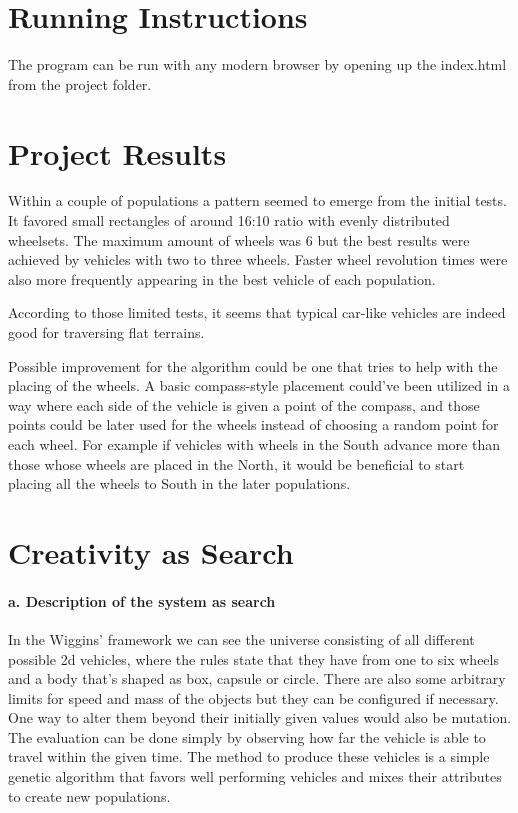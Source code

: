 \documentclass[english]{tktltiki}
\begin{document}
\section{Running Instructions}
The program can be run with any modern browser by opening up the index.html from the project folder.


\pagebreak
\section{Project Results}
Within a couple of populations a pattern seemed to emerge from the initial tests. It favored small rectangles of around 16:10 ratio with evenly distributed wheelsets. The maximum amount of wheels was 6 but
the best results were achieved by vehicles with two to three wheels. Faster wheel revolution times were also more frequently appearing in the best vehicle of each population.

According to those limited tests, it seems that typical car-like vehicles are indeed good for traversing flat terrains.

Possible improvement for the algorithm could be one that tries to help with the placing of the wheels. A basic compass-style placement could've been utilized in a way where each side of the vehicle
is given a point of the compass, and those points could be later used for the wheels instead of choosing a random point for each wheel. For example if vehicles with wheels in the South advance more than
those whose wheels are placed in the North, it would be beneficial to start placing all the wheels to South in the later populations.

\pagebreak

\section{Creativity as Search}

\paragraph{a. Description of the system as search}
In the Wiggins' framework we can see the universe consisting of all different possible 2d vehicles, where the rules state that they have from one to six wheels and a body that's shaped as box, capsule or circle.
There are also some arbitrary limits for speed and mass of the objects but they can be configured if necessary. One way to alter them beyond their initially given values would also be mutation. The evaluation
can be done simply by observing how far the vehicle is able to travel within the given time. The method to produce these vehicles is a simple genetic algorithm that favors well performing vehicles and mixes their attributes
to create new populations.
\end{document}
